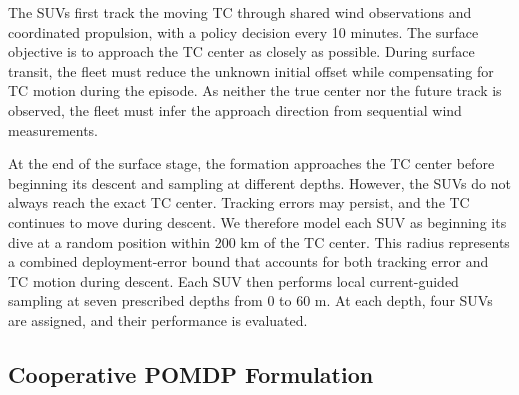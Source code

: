 \documentclass[a4paper,fleqn]{cas-dc}
\begin{document}
The SUVs first track the moving TC through shared wind observations and
coordinated propulsion, with a policy decision every 10 minutes. The surface
objective is to approach the TC center as closely as possible. During surface
transit, the fleet must reduce the unknown initial offset while compensating
for TC motion during the episode. As neither the true center nor the
future track is observed, the fleet must infer the approach direction from
sequential wind measurements.

At the end of the surface stage, the formation approaches the TC center before
beginning its descent and sampling at different depths. However, the SUVs do
not always reach the exact TC center. Tracking errors may persist, and the TC
continues to move during descent. We therefore model each
SUV as beginning its dive at a random position within 200 km of the TC center.
This radius represents a combined deployment-error bound that accounts for both
tracking error and TC motion during descent. Each SUV then performs local
current-guided sampling at seven prescribed depths from 0 to 60 m. At each
depth, four SUVs are assigned, and their performance is evaluated.

\subsection{Cooperative POMDP Formulation}\label{subsec:decpomdp}
\end{document}
